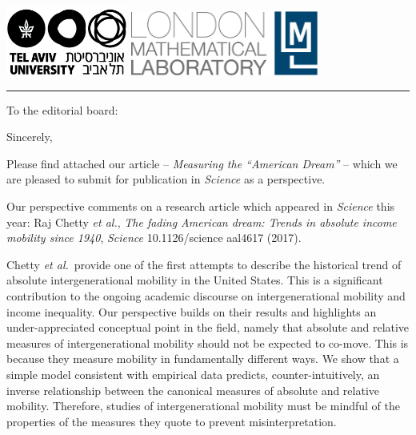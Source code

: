 \documentclass[12pt,letter,sans]{moderncv} %
\begin{document}
\noindent
\begin{flushleft}
\includegraphics[width=0.3\textwidth] {./tau1.jpg}
\hspace{97pt}
\includegraphics[width=0.463\textwidth] {./lml_LOGO_whiteBG.jpg}
\\ \vspace{-7pt}
\rule{160mm}{1.5pt}
\end{flushleft}


\vspace{3mm}

\date{\today}
\opening{To the editorial board:}
\closing{Sincerely,}
\makelettertitle
Please find attached our article -- \textit{Measuring the ``American Dream''} -- which we are pleased to submit for publication in \textit{Science} as a perspective.

Our perspective comments on a research article which appeared in \textit{Science} this year: Raj Chetty \textit{et al.}, \textit{The fading American dream: Trends in absolute income mobility since 1940}, \textit{Science} 10.1126/science aal4617 (2017).

Chetty \textit{et al.}~provide one of the first attempts to describe the historical trend of absolute intergenerational mobility in the United States. This is a significant contribution to the ongoing academic discourse on intergenerational mobility and income inequality. Our perspective builds on their results and highlights an under-appreciated conceptual point in the field, namely that absolute and relative measures of intergenerational mobility should not be expected to co-move. This is because they measure mobility in fundamentally different ways. We show that a simple model consistent with empirical data predicts, counter-intuitively, an inverse relationship between the canonical measures of absolute and relative mobility. Therefore, studies of intergenerational mobility must be mindful of the properties of the measures they quote to prevent misinterpretation.
\end{document}
